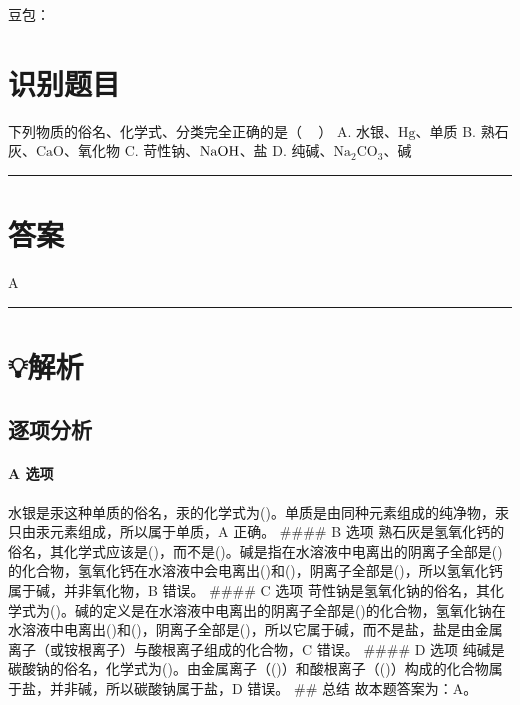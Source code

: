 \documentclass[
]{article}
\author{}
\date{}
\begin{document}
豆包：

\section{识别题目}\label{ux8bc6ux522bux9898ux76ee}

下列物质的俗名、化学式、分类完全正确的是（ ~ ） A.
水银、\(\mathrm{H}\mathrm{g}\)、单质 B.
熟石灰、\(\mathrm{C}\mathrm{a}\mathrm{O}\)、氧化物 C.
苛性钠、\(\ce{NaOH}\)、盐 D.
纯碱、\(\mathrm{N}{\mathrm{a}}_{\mathrm{2}}\mathrm{C}{\mathrm{O}}_{\mathrm{3}}\)、碱

\begin{center}\rule{0.5\linewidth}{0.5pt}\end{center}

\section{答案}\label{ux7b54ux6848}

A

\begin{center}\rule{0.5\linewidth}{0.5pt}\end{center}

\section{💡解析}\label{ux89e3ux6790}

\subsection{逐项分析}\label{ux9010ux9879ux5206ux6790}

\paragraph{A 选项}\label{a-ux9009ux9879}

水银是汞这种单质的俗名，汞的化学式为()。单质是由同种元素组成的纯净物，汞只由汞元素组成，所以属于单质，A
正确。 \#\#\#\# B 选项
熟石灰是氢氧化钙的俗名，其化学式应该是()，而不是()。碱是指在水溶液中电离出的阴离子全部是()的化合物，氢氧化钙在水溶液中会电离出()和()，阴离子全部是()，所以氢氧化钙属于碱，并非氧化物，B
错误。 \#\#\#\# C 选项
苛性钠是氢氧化钠的俗名，其化学式为()。碱的定义是在水溶液中电离出的阴离子全部是()的化合物，氢氧化钠在水溶液中电离出()和()，阴离子全部是()，所以它属于碱，而不是盐，盐是由金属离子（或铵根离子）与酸根离子组成的化合物，C
错误。 \#\#\#\# D 选项
纯碱是碳酸钠的俗名，化学式为()。由金属离子（()）和酸根离子（()）构成的化合物属于盐，并非碱，所以碳酸钠属于盐，D
错误。 \#\# 总结 故本题答案为：A。
\end{document}
